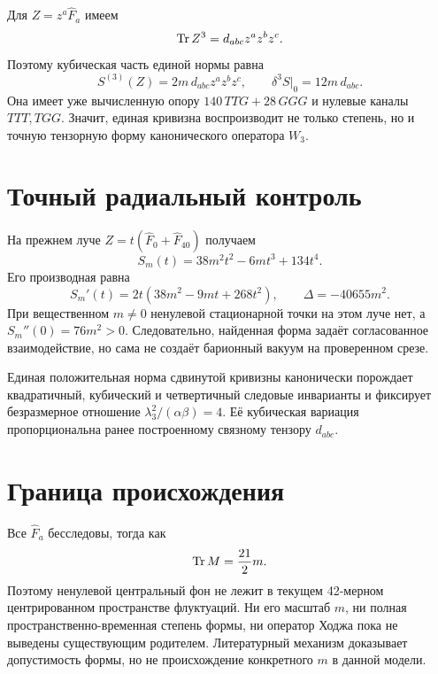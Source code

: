 Для $Z=z^a\widehat F_a$ имеем
\begin{equation}
 \operatorname{Tr} Z^3=d_{abc}z^az^bz^c.
 \label{eq:v8-baryon-cubic-trace-polynomial}
\end{equation}
Поэтому кубическая часть единой нормы равна
\begin{equation}
 S^{(3)}(Z)=2m\,d_{abc}z^az^bz^c,
 \qquad
 \delta^3S\big|_0=12m\,d_{abc}.
 \label{eq:v8-baryon-supercurvature-cubic-projection}
\end{equation}
Она имеет уже вычисленную опору $140\,TTG+28\,GGG$ и нулевые каналы
$TTT,TGG$. Значит, единая кривизна воспроизводит не только степень, но и
точную тензорную форму канонического оператора $W_3$.

\section{Точный радиальный контроль}

На прежнем луче $Z=t(\widehat F_0+\widehat F_{40})$ получаем
\begin{equation}
 S_m(t)=38m^2t^2-6mt^3+134t^4.
 \label{eq:v8-baryon-shifted-supercurvature-ray-action}
\end{equation}
Его производная равна
\begin{equation}
 S_m'(t)=2t\left(38m^2-9mt+268t^2\right),
 \qquad
 \Delta=-40655m^2.
 \label{eq:v8-baryon-shifted-supercurvature-ray-stationarity}
\end{equation}
При вещественном $m\ne0$ ненулевой стационарной точки на этом луче нет, а
$S_m''(0)=76m^2>0$. Следовательно, найденная форма задаёт согласованное
взаимодействие, но сама не создаёт барионный вакуум на проверенном срезе.

\begin{theorem}
Единая положительная норма сдвинутой кривизны канонически порождает
квадратичный, кубический и четвертичный следовые инварианты и фиксирует
безразмерное отношение $\lambda_3^2/(\alpha\beta)=4$. Её кубическая
вариация пропорциональна ранее построенному связному тензору $d_{abc}$.
\end{theorem}

\section{Граница происхождения}

Все $\widehat F_a$ бесследовы, тогда как
\begin{equation}
 \operatorname{Tr} M=\frac{21}{2}m.
 \label{eq:v8-baryon-central-background-trace}
\end{equation}
Поэтому ненулевой центральный фон не лежит в текущем 42-мерном
центрированном пространстве флуктуаций. Ни его масштаб $m$, ни полная
пространственно-временная степень формы, ни оператор Ходжа пока не выведены
существующим родителем. Литературный механизм доказывает допустимость
формы, но не происхождение конкретного $m$ в данной модели.

